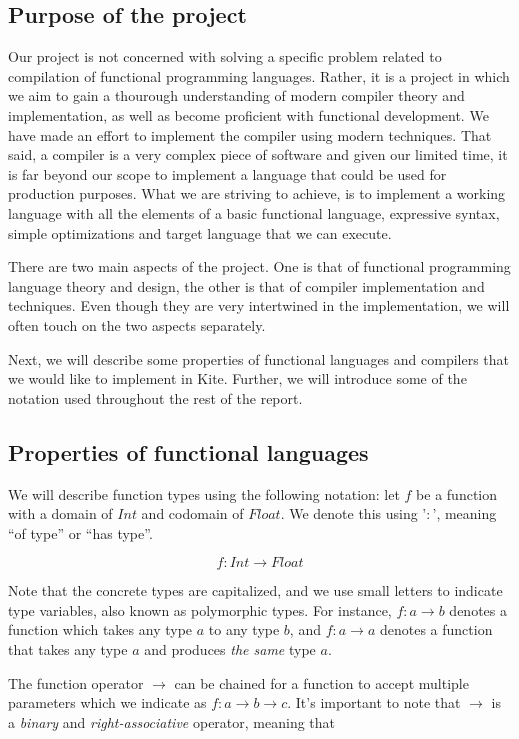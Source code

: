 
\subsection{Purpose of the project}
Our project is not concerned with solving a specific problem related to compilation of functional programming languages. Rather, it is a project in which we aim to gain a thourough understanding of modern compiler theory and implementation, as well as become proficient with functional development. We have made an effort to implement the compiler using modern techniques. That said, a compiler is a very complex piece of software and given our limited time, it is far beyond our scope to implement a language that could be used for production purposes. What we are striving to achieve, is to implement a working language with all the elements of a basic functional language, expressive syntax, simple optimizations and target language that we can execute.

There are two main aspects of the project. One is that of functional programming language theory and design, the other is that of compiler implementation and techniques. Even though they are very intertwined in the implementation, we will often touch on the two aspects separately.

Next, we will describe some properties of functional languages and compilers that we would like to implement in Kite. Further, we will introduce some of the notation used throughout the rest of the report.

\subsection{Properties of functional languages}
We will describe function types using the following notation: let $f$ be a function with a domain of $Int$ and codomain of $Float$. We denote this using '$:$', meaning ``of type'' or ``has type''.

\[ f: Int \to Float \]

Note that the concrete types are capitalized, and we use small letters to indicate type variables, also known as polymorphic types. For instance, $f: a \to b$ denotes a function which takes any type $a$ to any type $b$, and $f: a \to a$ denotes a function that takes any type $a$ and produces \emph{the same} type $a$.

The function operator $\to$ can be chained for a function to accept multiple parameters which we indicate as $f: a \to b \to c$. It's important to note that $\to$ is a \emph{binary} and \emph{right-associative} operator, meaning that


